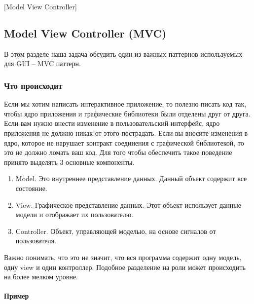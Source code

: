 [Model View Controller]


\subsection{Model View Controller (MVC)}
\label{section::MVC}

В этом разделе наша задача обсудить один из важных паттернов используемых для GUI -- MVC паттерн.

\subsubsection{Что происходит}

Если мы хотим написать интерактивное приложение, то полезно писать код так, чтобы ядро приложения и графические библиотеки были отделены друг от друга.
Если вам нужно внести изменение в пользовательский интерфейс, ядро приложения не должно никак от этого пострадать.
Если вы вносите изменения в ядро, которое не нарушает контракт соединения с графической библиотекой, то это не должно ломать ваш код.
Для того чтобы обеспечить такое поведение принято выделять 3 основные компоненты.
\begin{enumerate}
\item Model.
Это внутреннее представление данных.
Данный объект содержит все состояние.

\item View.
Графическое представление данных.
Этот объект использует данные модели и отображает их пользователю.

\item Controller.
Объект, управляющей моделью, на основе сигналов от пользователя.
\end{enumerate}
Важно понимать, что это не значит, что вся программа содержит одну модель, одну view и один контроллер.
Подобное разделение на роли может происходить на более мелком уровне.

\paragraph{Пример}

